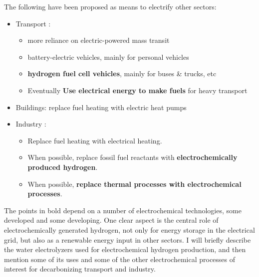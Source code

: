 The following have been proposed as means to electrify other sectors\cite{EU2018}:
\begin{itemize}
	\item Transport \cite{Cano2018, Thiel2016}:
	\begin{itemize}
		\item more reliance on electric-powered mass transit
		
		\item battery-electric vehicles, mainly for personal vehicles
		
		\item \textbf{hydrogen fuel cell vehicles}, mainly for buses \& trucks, etc
		
		\item Eventually \textbf{Use electrical energy to make fuels} for heavy transport
	\end{itemize}

	\item Buildings\cite{David2017}: replace fuel heating with electric heat pumps
	
	\item Industry \cite{Lechtenbohmer2016}:
	\begin{itemize}
		
		\item Replace fuel heating with electrical heating. 
		
		\item When possible, replace fossil fuel reactants with \textbf{electrochemically produced hydrogen}.
		
		\item
		When possible, \textbf{replace thermal processes with electrochemical processes}. 
		
	\end{itemize}
\end{itemize}

The points in bold depend on a number of electrochemical technologies, some developed and some developing. One clear aspect is the central role of electrochemically generated hydrogen, not only for energy storage in the electrical grid, but also as a renewable energy input in other sectors. 
I will briefly describe the water electrolyzers used for electrochemical hydrogen production, and then mention some of its uses and some of the other electrochemical processes of interest for decarbonizing transport and industry.

